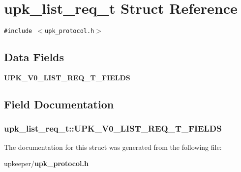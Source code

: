 \section{upk\_\-list\_\-req\_\-t Struct Reference}
\label{structupk__list__req__t}
{\tt \#include $<$upk\_\-protocol.h$>$}

\subsection*{Data Fields}
\begin{CompactItemize}
\item 
\bf{UPK\_\-V0\_\-LIST\_\-REQ\_\-T\_\-FIELDS}
\end{CompactItemize}


\subsection{Field Documentation}
\subsubsection{\setlength{\rightskip}{0pt plus 5cm}\bf{upk\_\-list\_\-req\_\-t::UPK\_\-V0\_\-LIST\_\-REQ\_\-T\_\-FIELDS}}\label{structupk__list__req__t_e5066b9ce741e43b690463d355346e02}




The documentation for this struct was generated from the following file:\begin{CompactItemize}
\item 
upkeeper/\bf{upk\_\-protocol.h}\end{CompactItemize}
